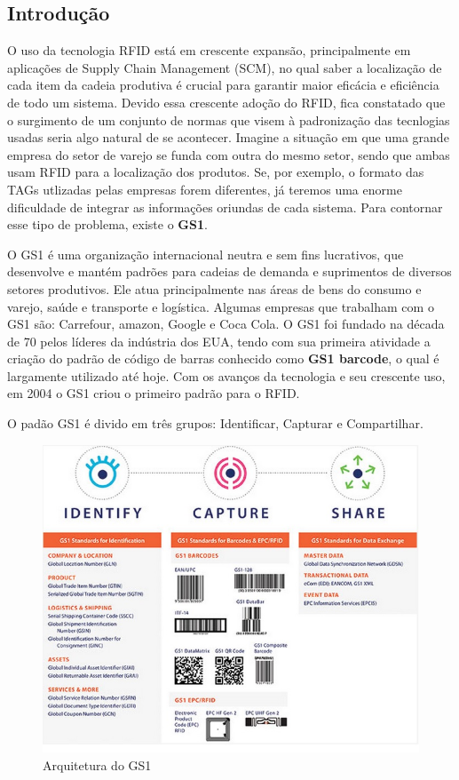 

%

\subsection{Introdução}	
	O uso da tecnologia RFID está em crescente expansão, principalmente em aplicações de Supply Chain Management (SCM), no qual saber a localização de cada item da cadeia produtiva é crucial para garantir maior eficácia e eficiência de todo um sistema. Devido essa crescente adoção do RFID, fica constatado que o surgimento de um conjunto de normas que visem à padronização das tecnlogias usadas seria algo natural de se acontecer. Imagine a situação em que uma grande empresa do setor de varejo se funda com outra do mesmo setor, sendo que ambas usam RFID para a localização dos produtos. Se, por exemplo, o formato das TAGs utlizadas pelas empresas forem diferentes, já teremos uma enorme dificuldade de integrar as informações oriundas de cada sistema. Para contornar esse tipo de problema, existe o \textbf{GS1}.
	
	O GS1 é uma organização internacional neutra e sem fins lucrativos, que desenvolve e mantém padrões para cadeias de demanda e suprimentos de diversos setores produtivos. Ele atua principalmente nas áreas de bens do consumo e varejo, saúde e transporte e logística. Algumas empresas que trabalham com o GS1 são: Carrefour, amazon, Google e Coca Cola. 	
	O GS1 foi fundado na década de 70 pelos líderes da indústria dos EUA, tendo com sua primeira atividade a criação do padrão de código de barras conhecido como \textbf{GS1 barcode}, o qual é largamente utilizado até hoje. Com os avanços da tecnologia e seu crescente uso, em 2004 o GS1 criou o primeiro padrão para o RFID.

	O padão GS1 é divido em três grupos: Identificar, Capturar e Compartilhar. 
	\begin{figure}[h!]
		\centering
		\includegraphics[width=0.7\linewidth]{gs1arch}
		\caption{Arquitetura do GS1}
		\label{fig:gs1arch}
	\end{figure}

